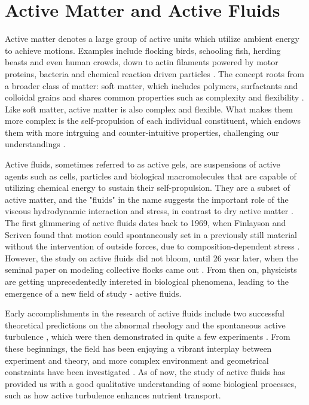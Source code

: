 \section{Active Matter and Active Fluids}
\label{active-fluids}

Active matter denotes a large group of active units which utilize ambient energy to achieve motions. Examples include flocking birds, schooling fish, herding beasts and even human crowds, down to actin filaments powered by motor proteins, bacteria and chemical reaction driven particles
\cite{Toner2005, Ramaswamy2010, Vicsek2012, Marchetti2013, Saintillan2013, Bechinger2016, Julicher2007}. The concept roots from a broader class of matter: soft matter, which includes polymers, surfactants and colloidal grains and shares common properties such as complexity and flexibility
\cite{DeGennes1992}. Like soft matter, active matter is also complex and flexible. What makes them more complex is the self-propulsion of each individual constituent, which endows them with more intrguing and counter-intuitive properties, challenging our understandings \cite{Glotzer2015}.


Active fluids, sometimes referred to as active gels, are suspensions of active agents such as cells, particles and biological macromolecules that are capable of utilizing chemical energy to sustain their self-propulsion. They are a subset of active matter, and the "fluids" in the name suggests the important role of the viscous hydrodynamic interaction and stress, in contrast to dry active matter \cite{Marchetti2013}. The first glimmering of active fluids dates back to 1969, when Finlayson and Scriven found that motion could spontaneously set in a previously still material without the intervention of outside forces, due to composition-dependent stress \cite{Finlayson1969}. However, the study on active fluids did not bloom, until 26 year later, when the seminal paper on modeling collective flocks came out \cite{Vicsek1995}. From then on, physicists are getting unprecedentedly intereted in biological phenomena, leading to the emergence of a new field of study - active fluids.

Early accomplishments in the research of active fluids include two successful theoretical predictions on the abnormal rheology and the spontaneous active turbulence \cite{Hatwalne2004, Simha2002}, which were then demonstrated in quite a few experiments
\cite{Dombrowski2004, Wensink2012, Rafai2010, Sokolov2009, Gachelin2013, Lopez2015}. From these beginnings, the field has been enjoying a vibrant interplay between experiment and theory, and more complex environment and geometrical constraints have been investigated \cite{Ramaswamy2019}. As of now, the study of active fluids has provided us with a good qualitative understanding of some biological processes, such as how active turbulence enhances nutrient transport.

